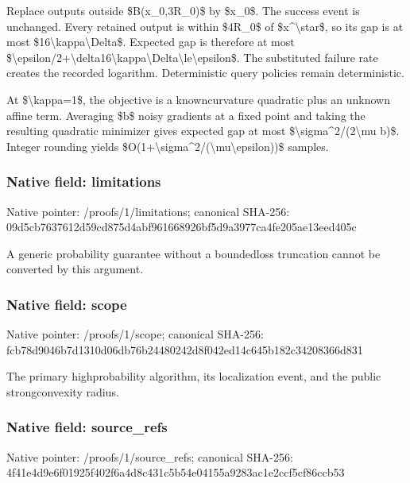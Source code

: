 \documentclass[10pt,a4paper]{article}
\begin{document}
Replace outputs outside \$B(x\_0,3R\_0)\$ by \$x\_0\$. The success event is unchanged. Every retained output is within \$4R\_0\$ of \$x\textasciicircum{}\textbackslash{}star\$, so its gap is at most \$16\textbackslash{}kappa\textbackslash{}Delta\$. Expected gap is therefore at most
\$\textbackslash{}epsilon/2+\textbackslash{}delta16\textbackslash{}kap\allowbreak{}pa\textbackslash{}Delta\textbackslash{}le\textbackslash{}epsilon\$.
The substituted failure rate creates the recorded logarithm. Deterministic query policies remain deterministic.

At \$\textbackslash{}kappa=1\$, the objective is a knowncurvature quadratic plus an unknown affine term. Averaging \$b\$ noisy gradients at a fixed point and taking the resulting quadratic minimizer gives expected gap at most \$\textbackslash{}sigma\textasciicircum{}2/(2\textbackslash{}mu b)\$. Integer rounding yields \$O(1+\textbackslash{}sigma\textasciicircum{}2/(\textbackslash{}mu\textbackslash{}epsilon))\$ samples.


\subsubsection{Native field: limitations}


Native pointer: /proofs/1/limitations; canonical SHA-256: 09d5cb7637612d59cd875d4a\allowbreak{}bf961668926bf5d9a3977ca4\allowbreak{}fe205ae13eed405c


A generic probability guarantee without a boundedloss truncation cannot be converted by this argument.


\subsubsection{Native field: scope}


Native pointer: /proofs/1/scope; canonical SHA-256: fcb78d9046b7d1310d06db76\allowbreak{}b24480242d8f042ed14c645b\allowbreak{}182c34208366d831


The primary highprobability algorithm, its localization event, and the public strongconvexity radius.


\subsubsection{Native field: source\_refs}


Native pointer: /proofs/1/source\_refs; canonical SHA-256: 4f41e4d9e6f01925f402f6a4\allowbreak{}d8c431c5b54e04155a9283ac\allowbreak{}1e2ccf5cf86ccb53
\end{document}
